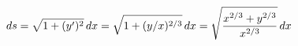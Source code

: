 \documentclass[preview]{standalone}
\begin{document}
\begin{align*}
\special{dvisvgm:raw <g id='unique000'>}ds=\sqrt{1+(y')^2}\,dx=\sqrt{1+(y/x)^{2/3}}\,dx=\sqrt{\dfrac{x^{2/3}+y^{2/3}}{x^{2/3}}}\,dx\special{dvisvgm:raw </g>}
\end{align*}
\end{document}
